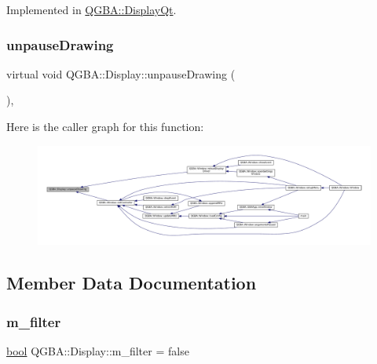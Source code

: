 Implemented in \mbox{\hyperlink{class_q_g_b_a_1_1_display_qt_a48a331d3d100e41168902d62159b9f2f}{Q\+G\+B\+A\+::\+Display\+Qt}}.

\mbox{\label{class_q_g_b_a_1_1_display_a31bbebac223ef11539ab5fa189893c89}} 
\subsubsection{\texorpdfstring{unpause\+Drawing}{unpauseDrawing}}
{\footnotesize\ttfamily virtual void Q\+G\+B\+A\+::\+Display\+::unpause\+Drawing (\begin{DoxyParamCaption}{ }\end{DoxyParamCaption})\hspace{0.3cm}{\ttfamily [pure virtual]}, {\ttfamily [slot]}}

Here is the caller graph for this function\+:
\nopagebreak
\begin{figure}[H]
\begin{center}
\leavevmode
\includegraphics[width=350pt]{class_q_g_b_a_1_1_display_a31bbebac223ef11539ab5fa189893c89_icgraph}
\end{center}
\end{figure}


\subsection{Member Data Documentation}
\mbox{\label{class_q_g_b_a_1_1_display_afddadaa9c7e762b3ea45c7335dc98255}} 
\subsubsection{\texorpdfstring{m\+\_\+filter}{m\_filter}}
{\footnotesize\ttfamily \mbox{\hyperlink{libretro_8h_a4a26dcae73fb7e1528214a068aca317e}{bool}} Q\+G\+B\+A\+::\+Display\+::m\+\_\+filter = false\hspace{0.3cm}{\ttfamily [private]}}


